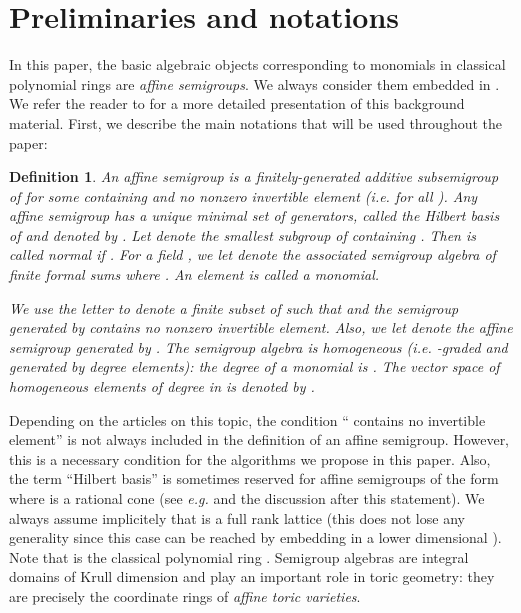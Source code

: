 \documentclass[12pt]{article}
\numberwithin{equation}{section}
\numberwithin{theorem}{section}
\newtheorem{definition}[theorem]{Definition}
\begin{document}
\section{Preliminaries and notations}\label{sec:background}
In this paper, the basic algebraic objects corresponding to monomials
in classical polynomial rings are \emph{affine semigroups}. We always
consider them embedded in . We refer the reader to
\cite{MilStu05,CoxLitSch11,fulton1993introduction} for a more detailed
presentation of this background material.  First, we describe the main
notations that will be used throughout the paper:
\begin{definition}\label{def:affinesgp}
  An \emph{affine semigroup}  is a finitely-gene\-ra\-ted additive subsemigroup of
   for some  containing  and no
  nonzero invertible element (\emph{i.e.} for all ). Any affine semigroup has a unique minimal set of
  generators, called the \emph{Hilbert basis} of  and denoted by
  . Let  denote the smallest subgroup of
   containing . Then  is called \emph{normal} if
  . For a
  field , we let  denote the associated \emph{semigroup
    algebra} of finite formal sums 
  where . An element  is called a
  \emph{monomial}.

  We use the letter  to denote a finite subset of  such that
   and the semigroup  generated by  contains no nonzero
  invertible element. Also, we let  denote the affine
  semigroup generated by . The semigroup algebra  is
  \emph{homogeneous} (\emph{i.e.} -graded and generated by degree
   elements): the degree of a monomial  is
  . The vector space of homogeneous elements of degree  in  is denoted by .
\end{definition}

Depending on the articles on this topic, the condition ``
contains no invertible element'' is not always included in the
definition of an affine semigroup. However, this is a necessary
condition for the algorithms we propose in this paper. Also, the term
``Hilbert basis'' is sometimes reserved for affine semigroups of the
form  where  is a rational cone (see \emph{e.g.}
\cite[Prop.~7.15]{MilStu05} and the discussion after this
statement). We always assume implicitely that  is a
full rank lattice (this does not lose any generality since this case
can be reached by embedding  in a lower dimensional
). Note that  is the classical polynomial ring
. Semigroup algebras are integral domains
\cite[Thm. 7.4]{MilStu05} of Krull dimension  and play an important
role in toric geometry: they are precisely the coordinate rings of
\emph{affine toric varieties}.  
\end{document}
